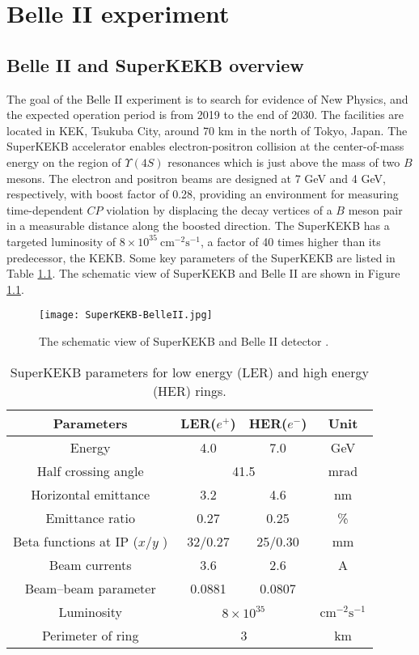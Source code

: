\chapter{Belle II experiment}
\section{Belle II and SuperKEKB overview}
The goal of the Belle II experiment is to search for evidence of New Physics, and the expected operation period is from 2019 to the end of 2030. The facilities are located in KEK, Tsukuba City, around 70 km in the north of Tokyo, Japan. The SuperKEKB accelerator enables electron-positron collision at the center-of-mass energy on the region of $\Upsilon(4S)$ resonances which is just above the mass of two $B$ mesons. The electron and positron beams are designed at 7 GeV and 4 GeV, respectively, with boost factor of 0.28, providing an environment for measuring time-dependent $CP$ violation by displacing the decay vertices of a $B$ meson pair in a measurable distance along the boosted direction. The SuperKEKB has a targeted luminosity of $8\times 10^{35}\: \text{cm}^{-2} \text{s}^{-1}$, a factor of 40 times higher than its predecessor, the KEKB.  Some key parameters of the SuperKEKB are listed in Table \ref{tab:superkekb_pars}. The schematic view of SuperKEKB and Belle II are shown in Figure \ref{fig:superkekb_belle2}.

\begin{figure}
	\centering 
	\texttt{[image: SuperKEKB-BelleII.jpg]}
	\caption{The schematic view of SuperKEKB and Belle II detector \cite{Abe:2010gxa}.}
	\label{fig:superkekb_belle2}
\end{figure}

\begin{table}[H]
	\centering
	\large
	\caption{SuperKEKB parameters for low energy (LER) and high energy (HER) rings.\cite{b2book}}
	\label{tab:superkekb_pars}
	\begin{tabular}{c c c c}
		\toprule
		
		Parameters & LER($e^+$) & HER($e^-$) & Unit\\
		\hline
		Energy & 4.0 & 7.0 & GeV\\
		Half crossing angle & \multicolumn{2}{c}{41.5} & mrad\\
		Horizontal emittance & 3.2 & 4.6 & nm \\
		Emittance ratio & 0.27 & 0.25 & \%\\
		Beta functions at IP ($x$/$y$ ) & 32/0.27 & 25/0.30 & mm\\
		Beam currents & 3.6 & 2.6 &  A \\
		Beam–beam parameter & 0.0881 & 0.0807 & {}\\
		Luminosity & \multicolumn{2}{c}{$8\times 10^{35}$} &  $\text{cm}^{-2} \text{s}^{-1}$\\
		Perimeter of ring & \multicolumn{2}{c}{3} & km\\
		
		\bottomrule
	\end{tabular}
\end{table}


